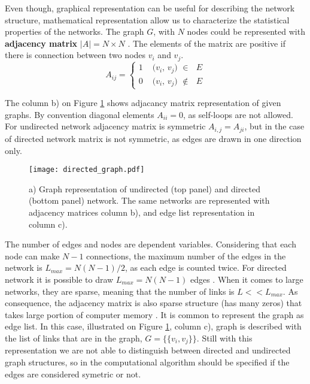 Even though, graphical representation can be useful for describing the network structure, mathematical representation allow us to characterize the statistical properties of the networks. The graph $G$, with $N$ nodes could be represented with \textbf{adjacency matrix} $|A| = N \times N$ \cite{boccaletti2006complex}. The elements of the matrix are positive if there is connection between two nodes $v_i$ and $v_j$. 
\begin{equation}
A_{ij} =
\begin{cases}
1 & \text{ ($v_i$, $v_j$) $\in$ $E$}\\
0 & \text{ ($v_i$, $v_j$) $\notin$ $E$}
\end{cases}       
\end{equation}

The column b) on Figure \ref{fig:graph_dir} shows adjacancy matrix representation of given graphs. By convention diagonal elements $A_{ii}=0$, as self-loops are not allowed. For undirected network adjacency matrix is symmetric $A_{i,j}=A_{ji}$, but in the case of directed network matrix is not symmetric, as edges are drawn in one direction only.  

\begin{figure}[h]
	\centering
	\texttt{[image: directed\_graph.pdf]} 
	\caption[Graph, matrix and edge list representations.]{a) Graph representation of undirected (top panel) and directed (bottom panel) network. The same networks are represented with adjacency matrices column b), and edge list representation in column c).}
	\label{fig:graph_dir}
\end{figure}

The number of edges and nodes are dependent variables. Considering that each node can make $N-1$ connections, the maximum number of the edges in the network is $L_{max}=N(N-1)/2$, as each edge is counted twice. For directed network it is possible to draw $L_{max}=N(N-1)$ edges \cite{caldarelli2007scalefree}. When it comes to large networks, they are sparse, meaning that the number of links is $L<<L_{max}$. As consequence, the adjacency matrix is also sparse structure (has many zeros) that takes large portion of computer memory \cite{barabasi2016network}. 
It is common to represent the graph as edge list. In this case, illustrated on Figure \ref{fig:graph_dir}, column c), graph is described with the list of links that are in the graph, $G = \{ \{v_i,v_j\}\}$. Still with this representation we are not able to distinguish between directed and undirected graph structures, so in the computational algorithm should be specified if the edges are considered symetric or not.  


